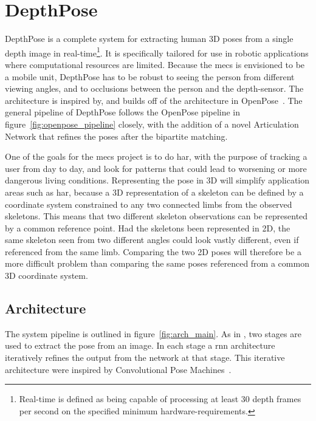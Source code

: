 \chapter{DepthPose}

DepthPose is a complete system for extracting human 3D poses from a single depth image in real-time\footnote{Real-time is defined as being capable of processing at least 30 depth frames per second on the specified minimum hardware-requirements.}. It is specifically tailored for use in robotic applications where computational resources are limited. Because the \gls{mecs} is envisioned to be a mobile unit, DepthPose has to be robust to seeing the person from different viewing angles, and to occlusions between the person and the depth-sensor. The architecture is inspired by, and builds off of the architecture in OpenPose~\cite{cao2019openpose}. The general pipeline of DepthPose follows the OpenPose pipeline in figure~\ref{fig:openpose_pipeline} closely, with the addition of a novel Articulation Network that refines the poses after the bipartite matching.

One of the goals for the \gls{mecs} project is to do \gls{har}, with the purpose of tracking a user from day to day, and look for patterns that could lead to worsening or more dangerous living conditions. Representing the pose in 3D will simplify application areas such as \gls{har}, because a 3D representation of a skeleton can be defined by a coordinate system constrained to any two connected limbs from the observed skeletons. This means that two different skeleton observations can be represented by a common reference point. Had the skeletons been represented in 2D, the same skeleton seen from two different angles could look vastly different, even if referenced from the same limb. Comparing the two 2D poses will therefore be a more difficult problem than comparing the same poses referenced from a common 3D coordinate system.



\section{Architecture}

The system pipeline is outlined in figure~\ref{fig:arch_main}. As in \cite{cao2019openpose}, two stages are used to extract the pose from an image. In each stage a \gls{rnn} architecture iteratively refines the output from the network at that stage. This iterative architecture were inspired by Convolutional Pose Machines~\cite{wei2016cpm}.

